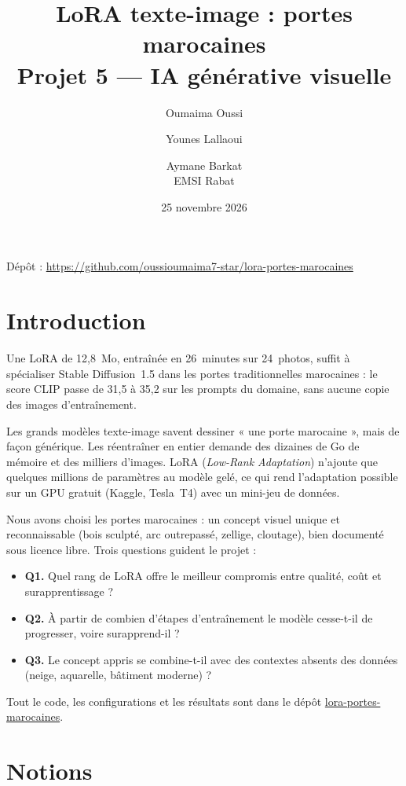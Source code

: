 \documentclass[11pt,a4paper]{article}
\title{\textbf{LoRA texte-image : portes marocaines}\\[4pt]
\large Projet 5 --- IA générative visuelle}
\author{Oumaima Oussi \and Younes Lallaoui \and Aymane Barkat\\[2pt]
\small EMSI Rabat}
\date{25 novembre 2026}
\begin{document}
\maketitle

\begin{center}
\small Dépôt : \url{https://github.com/oussioumaima7-star/lora-portes-marocaines}
\end{center}

\section{Introduction}

Une LoRA de 12,8~Mo, entraînée en 26~minutes sur 24~photos, suffit à spécialiser Stable Diffusion~1.5 dans les portes traditionnelles marocaines : le score CLIP passe de 31,5 à 35,2 sur les prompts du domaine, sans aucune copie des images d'entraînement.

Les grands modèles texte-image savent dessiner « une porte marocaine », mais de façon générique. Les réentraîner en entier demande des dizaines de Go de mémoire et des milliers d'images. LoRA (\emph{Low-Rank Adaptation}) n'ajoute que quelques millions de paramètres au modèle gelé, ce qui rend l'adaptation possible sur un GPU gratuit (Kaggle, Tesla~T4) avec un mini-jeu de données.

Nous avons choisi les portes marocaines : un concept visuel unique et reconnaissable (bois sculpté, arc outrepassé, zellige, cloutage), bien documenté sous licence libre. Trois questions guident le projet :
\begin{itemize}
  \item \textbf{Q1.} Quel rang de LoRA offre le meilleur compromis entre qualité, coût et surapprentissage ?
  \item \textbf{Q2.} À partir de combien d'étapes d'entraînement le modèle cesse-t-il de progresser, voire surapprend-il ?
  \item \textbf{Q3.} Le concept appris se combine-t-il avec des contextes absents des données (neige, aquarelle, bâtiment moderne) ?
\end{itemize}

Tout le code, les configurations et les résultats sont dans le dépôt \href{https://github.com/oussioumaima7-star/lora-portes-marocaines}{lora-portes-marocaines}.

\section{Notions}
\end{document}
